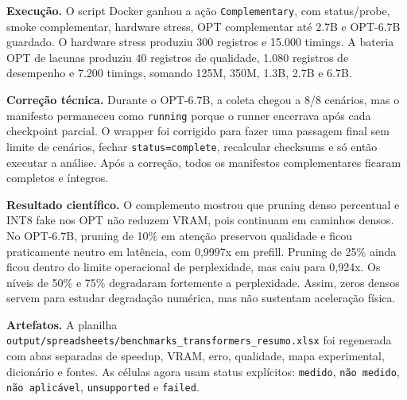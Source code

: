 \textbf{Execução.} O script Docker ganhou a ação \texttt{Complementary}, com
status/probe, smoke complementar, hardware stress, OPT complementar até 2.7B e
OPT-6.7B guardado. O hardware stress produziu 300 registros e 15.000 timings.
A bateria OPT de lacunas produziu 40 registros de qualidade, 1.080 registros de
desempenho e 7.200 timings, somando 125M, 350M, 1.3B, 2.7B e 6.7B.

\textbf{Correção técnica.} Durante o OPT-6.7B, a coleta chegou a 8/8 cenários,
mas o manifesto permaneceu como \texttt{running} porque o runner encerrava após
cada checkpoint parcial. O wrapper foi corrigido para fazer uma passagem final
sem limite de cenários, fechar \texttt{status=complete}, recalcular checksums e
só então executar a análise. Após a correção, todos os manifestos complementares
ficaram completos e íntegros.

\textbf{Resultado científico.} O complemento mostrou que pruning denso
percentual e INT8 fake nos OPT não reduzem VRAM, pois continuam em caminhos
densos. No OPT-6.7B, pruning de 10\% em atenção preservou qualidade e ficou
praticamente neutro em latência, com 0,9997x em prefill. Pruning de 25\% ainda
ficou dentro do limite operacional de perplexidade, mas caiu para 0,924x. Os
níveis de 50\% e 75\% degradaram fortemente a perplexidade. Assim, zeros densos
servem para estudar degradação numérica, mas não sustentam aceleração física.

\textbf{Artefatos.} A planilha
\texttt{output/\allowbreak{}spreadsheets/\allowbreak{}benchmarks\_\allowbreak{}transformers\_\allowbreak{}resumo.xlsx}
foi regenerada com abas separadas de speedup, VRAM, erro, qualidade, mapa
experimental, dicionário e fontes. As células agora usam status explícitos:
\texttt{medido}, \texttt{não medido}, \texttt{não aplicável},
\texttt{unsupported} e \texttt{failed}.
